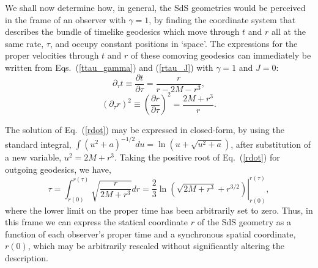 We shall now determine how, in general, the SdS geometries would be perceived in the frame of an observer with $\gamma=1$, by finding the coordinate system that describes the bundle of timelike geodesics which move through $t$ and $r$ all at the same rate, $\tau$, and occupy constant positions in `space'. The expressions for the proper velocities through $t$ and $r$ of these comoving geodesics can immediately be written from Eqs.~(\ref{ttau_gamma}) and (\ref{rtau_J}) with $\gamma=1$ and $J=0$:
\begin{equation}
\partial_{\tau}{t}\equiv\frac{\partial{t}}{\partial\tau}=\frac{r}{r-2M-r^3},\label{tdot}
\end{equation}
\begin{equation}
(\partial_{\tau}r)^2\equiv\left(\frac{\partial{r}}{\partial\tau}\right)^2=\frac{2M+r^3}{r}.\label{rdot}
\end{equation} 

The solution of Eq.~(\ref{rdot}) may be expressed in closed-form, by using the standard integral, $\int\left(u^2+a\right)^{-1/2}du=\ln\left(u+\sqrt{u^2+a}\right)$, after substitution of a new variable, $u^2=2M+r^3$. Taking the positive root of Eq.~(\ref{rdot}) for outgoing geodesics, we have,
\begin{equation}
\tau=\int^{r(\tau)}_{r(0)}\sqrt{\frac{r}{2M+r^3}}dr=\left.\frac{2}{3}\ln\left(\sqrt{2M+r^3}+r^{3/2}\right)\right|^{r(\tau)}_{r(0)},\label{t_int}
\end{equation}
where the lower limit on the proper time has been arbitrarily set to zero. Thus, in this frame we can express the statical coordinate $r$ of the SdS geometry as a function of each observer's proper time and a synchronous spatial coordinate, $r(0)$, which may be arbitrarily rescaled without significantly altering the description.


